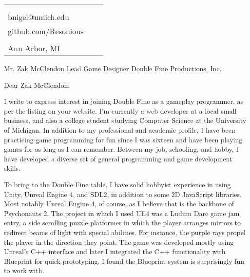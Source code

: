\documentclass[12pt]{article}
\makeatletter
\def \address{2287 S. Main St.\\Ann Arbor, MI}
\def \author{Nigel Baillie}
\def \email{bnigel@umich.edu}
\def \phonenumber{(734) 678-5328}
\def \bday{Born April $11^{\text{th}}$ 1995}
\def \github{github.com/Resonious}
\makeatother
\begin{document}
\newlength{\rcollength}\setlength{\rcollength}{3.0in}%
\begin{tabular} {
  p{}
  p{}
  p{}
}
  \begin{flushleft}
    {\Huge{\author}}\\
    \vspace{1.5 mm}
  \end{flushleft}
  &
  \begin{center}
    {\phonenumber}\\
    {\email}\\
    {\github}
  \end{center}
  &
  \begin{flushright}
    {\bday}\\
    {\address}
  \end{flushright}
\end{tabular}

Mr. Zak McClendon
\newline
Lead Game Designer
\newline
Double Fine Productions, Inc.
\newline

Dear Zak McClendon:
\newline

I write to express interest in joining Double Fine as a gameplay programmer,
as per the listing on your website.
I'm currently a web developer at a local small business, and also a college
student studying Computer Science at the University of Michigan. In addition
to my professional and academic profile, I have been practicing game programming
for fun since I was sixteen and have been playing games for as long as I can
remember. Between my job, schooling, and hobby, I have developed a diverse
set of general programming and game development skills.
\newline

To bring to the Double Fine table, I have solid hobbyist experience in using Unity,
Unreal Engine 4, and SDL2, in addition to some 2D JavaScript libraries.
Most notably Unreal Engine 4, of course, as I believe that is the backbone of
Psychonauts 2. The project in which I used UE4 was a Ludum Dare game jam
entry, a side scrolling puzzle platformer in which the player arranges
mirrors to redirect beams of light with special abilities. For instance,
the purple rays propel the player in the direction they point. The game
was developed mostly using Unreal's C++ interface and later I integrated
the C++ functionality with Blueprint for quick prototyping. I found the Blueprint
system is surprisingly fun to work with.
\newline
\end{document}
